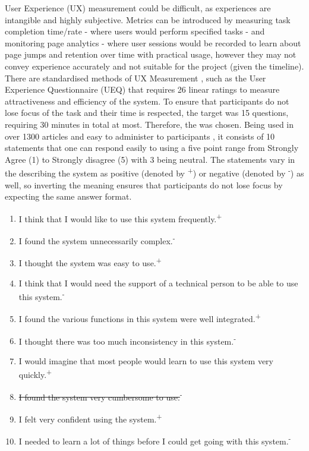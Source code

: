 \documentclass[../main.tex]{subfiles}
\begin{document}
User Experience (UX) measurement could be difficult, as experiences are intangible and highly subjective. Metrics can be introduced by measuring task completion time/rate - where users would perform specified tasks - and monitoring page analytics - where user sessions would be recorded to learn about page jumps and retention over time with practical usage, however they may not convey experience accurately and not suitable for the project (given the timeline). There are standardised methods of UX Measurement \cite{phdThreeBranchesStandardized}, such as the User Experience Questionnaire (UEQ) that requires 26 linear ratings to measure attractiveness and efficiency of the system. To ensure that participants do not lose focus of the task and their time is respected, the target was 15 questions, requiring 30 minutes in total at most. Therefore, the  was chosen. Being used in over 1300 articles and easy to administer to participants \cite{affairsSystemUsabilityScale2013}, it consists of 10 statements that one can respond easily to using a five point range from Strongly Agree (1) to Strongly disagree (5) with 3 being neutral. The statements vary in the describing the system as positive (denoted by \textsuperscript{+}) or negative (denoted by \textsuperscript{-}) as well, so inverting the meaning ensures that participants do not lose focus by expecting the same answer format.

\begin{enumerate}
    \item I think that I would like to use this system frequently.\textsuperscript{+}
    \item I found the system unnecessarily complex.\textsuperscript{-}
    \item I thought the system was easy to use.\textsuperscript{+}
    \item I think that I would need the support of a technical person to be able to use this system.\textsuperscript{-}
    \item I found the various functions in this system were well integrated.\textsuperscript{+}
    \item I thought there was too much inconsistency in this system.\textsuperscript{-}
    \item I would imagine that most people would learn to use this system very quickly.\textsuperscript{+}
    \item \sout{I found the system very cumbersome to use.}\textsuperscript{-}
    \item I felt very confident using the system.\textsuperscript{+}
    \item I needed to learn a lot of things before I could get going with this system.\textsuperscript{-}
\end{enumerate}
\end{document}
